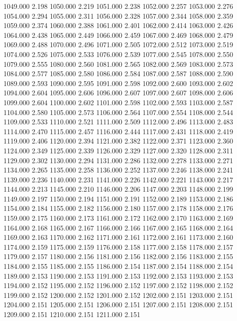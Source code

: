 1049.000 2.198 
1050.000 2.219 
1051.000 2.238 
1052.000 2.257 
1053.000 2.276 
1054.000 2.294 
1055.000 2.311 
1056.000 2.328 
1057.000 2.344 
1058.000 2.359 
1059.000 2.374 
1060.000 2.388 
1061.000 2.401 
1062.000 2.414 
1063.000 2.426 
1064.000 2.438 
1065.000 2.449 
1066.000 2.459 
1067.000 2.469 
1068.000 2.479 
1069.000 2.488 
1070.000 2.496 
1071.000 2.505 
1072.000 2.512 
1073.000 2.519 
1074.000 2.526 
1075.000 2.533 
1076.000 2.539 
1077.000 2.545 
1078.000 2.550 
1079.000 2.555 
1080.000 2.560 
1081.000 2.565 
1082.000 2.569 
1083.000 2.573 
1084.000 2.577 
1085.000 2.580 
1086.000 2.584 
1087.000 2.587 
1088.000 2.590 
1089.000 2.593 
1090.000 2.595 
1091.000 2.598 
1092.000 2.600 
1093.000 2.602 
1094.000 2.604 
1095.000 2.606 
1096.000 2.607 
1097.000 2.607 
1098.000 2.606 
1099.000 2.604 
1100.000 2.602 
1101.000 2.598 
1102.000 2.593 
1103.000 2.587 
1104.000 2.580 
1105.000 2.573 
1106.000 2.564 
1107.000 2.554 
1108.000 2.544 
1109.000 2.533 
1110.000 2.521 
1111.000 2.509 
1112.000 2.496 
1113.000 2.483 
1114.000 2.470 
1115.000 2.457 
1116.000 2.444 
1117.000 2.431 
1118.000 2.419 
1119.000 2.406 
1120.000 2.394 
1121.000 2.382 
1122.000 2.371 
1123.000 2.360 
1124.000 2.349 
1125.000 2.339 
1126.000 2.329 
1127.000 2.320 
1128.000 2.311 
1129.000 2.302 
1130.000 2.294 
1131.000 2.286 
1132.000 2.278 
1133.000 2.271 
1134.000 2.265 
1135.000 2.258 
1136.000 2.252 
1137.000 2.246 
1138.000 2.241 
1139.000 2.236 
1140.000 2.231 
1141.000 2.226 
1142.000 2.221 
1143.000 2.217 
1144.000 2.213 
1145.000 2.210 
1146.000 2.206 
1147.000 2.203 
1148.000 2.199 
1149.000 2.197 
1150.000 2.194 
1151.000 2.191 
1152.000 2.189 
1153.000 2.186 
1154.000 2.184 
1155.000 2.182 
1156.000 2.180 
1157.000 2.178 
1158.000 2.176 
1159.000 2.175 
1160.000 2.173 
1161.000 2.172 
1162.000 2.170 
1163.000 2.169 
1164.000 2.168 
1165.000 2.167 
1166.000 2.166 
1167.000 2.165 
1168.000 2.164 
1169.000 2.163 
1170.000 2.162 
1171.000 2.161 
1172.000 2.161 
1173.000 2.160 
1174.000 2.159 
1175.000 2.159 
1176.000 2.158 
1177.000 2.158 
1178.000 2.157 
1179.000 2.157 
1180.000 2.156 
1181.000 2.156 
1182.000 2.156 
1183.000 2.155 
1184.000 2.155 
1185.000 2.155 
1186.000 2.154 
1187.000 2.154 
1188.000 2.154 
1189.000 2.153 
1190.000 2.153 
1191.000 2.153 
1192.000 2.153 
1193.000 2.153 
1194.000 2.152 
1195.000 2.152 
1196.000 2.152 
1197.000 2.152 
1198.000 2.152 
1199.000 2.152 
1200.000 2.152 
1201.000 2.152 
1202.000 2.151 
1203.000 2.151 
1204.000 2.151 
1205.000 2.151 
1206.000 2.151 
1207.000 2.151 
1208.000 2.151 
1209.000 2.151 
1210.000 2.151 
1211.000 2.151 
